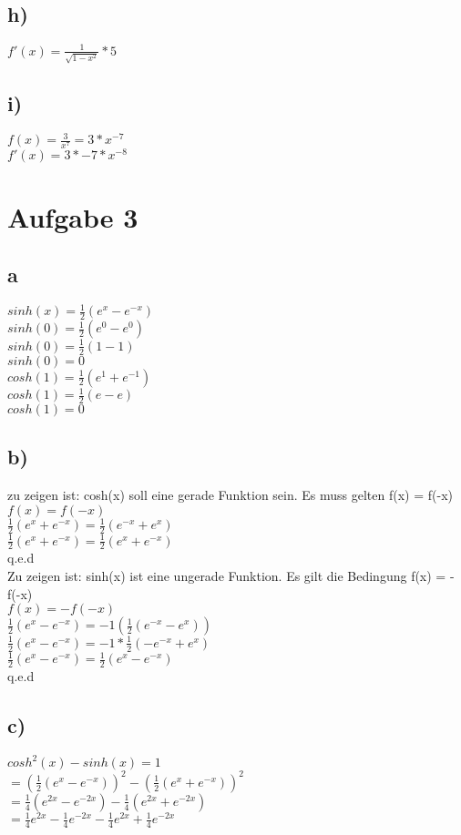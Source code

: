\documentclass{article}
\begin{document}
	\subsection*{h)}
	$f'(x) = \frac{1}{\sqrt{1-x^2}}*5$
	\subsection*{i)}
	$f(x) = \frac{3}{x^7} = 3 * x^{-7}$ \\
	$f'(x) = 3 * -7 * x^{-8}$
	\section*{Aufgabe 3}
	\subsection*{a}
	$sinh(x) = \frac{1}{2}(e^x - e^{-x})$ \\
	$sinh(0) = \frac{1}{2}(e^0 - e^0)$ \\
	$sinh(0) = \frac{1}{2}(1 - 1)$ \\
	$sinh(0) = 0$ \\
	$cosh(1) = \frac{1}{2}(e^1 + e^{-1})$ \\
	$cosh(1) = \frac{1}{2}(e - e)$ \\
	$cosh(1) = 0$
	\subsection*{b)}
	zu zeigen ist: cosh(x) soll eine gerade  Funktion sein. Es muss gelten f(x) = f(-x) \\
	$f(x) = f(-x)$ \\
	$\frac{1}{2}(e^x + e^{-x}) = \frac{1}{2}(e^{-x} + e^x)$ \\
	$\frac{1}{2}(e^x + e^{-x}) = \frac{1}{2}(e^x + e^{-x})$ \\
	q.e.d \\
	Zu zeigen ist: sinh(x) ist eine ungerade Funktion. Es gilt die Bedingung f(x) = -f(-x) \\
	$f(x) = -f(-x)$ \\
	$\frac{1}{2}(e^x - e^{-x}) = -1(\frac{1}{2}(e^{-x} -  e^x))$ \\
	$\frac{1}{2}(e^x - e^{-x}) = -1 * \frac{1}{2}(-e^{-x} +  e^x)$ \\
	$\frac{1}{2}(e^x - e^{-x}) = \frac{1}{2}(e^{x} -  e^{-x})$ \\
	q.e.d
	\subsection*{c)}
	$cosh^2(x) - sinh(x) = 1$ \\
	$= (\frac{1}{2}(e^x - e^{-x}))^2 - (\frac{1}{2}(e^x + e^{-x}))^2$ \\
	$= \frac{1}{4}(e^{2x} - e^{-2x}) - \frac{1}{4}(e^{2x} + e^{-2x})$ \\
	$= \frac{1}{4}e^{2x} - \frac{1}{4}e^{-2x} - \frac{1}{4}e^{2x} + \frac{1}{4}e^{-2x}$ 
\end{document}
